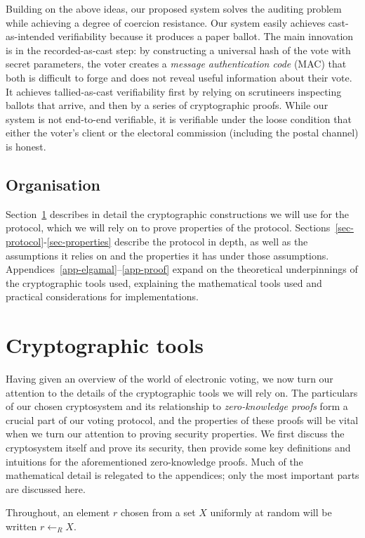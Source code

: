 \documentclass[12pt,a4paper]{article}
\theoremstyle{definition}
\newcounter{protocol}
\begin{document}
Building on the above ideas, our proposed system solves the auditing problem while achieving a degree of coercion resistance. Our system easily achieves cast-as-intended verifiability because it produces a paper ballot. The main innovation is in the recorded-as-cast step: by constructing a universal hash of the vote with secret parameters, the voter creates a \textit{message authentication code} (MAC) that both is difficult to forge and does not reveal useful information about their vote. It achieves tallied-as-cast verifiability first by relying on scrutineers inspecting ballots that arrive, and then by a series of cryptographic proofs. While our system is not end-to-end verifiable, it is verifiable under the loose condition that either the voter's client or the electoral commission (including the postal channel) is honest.

\subsection{Organisation}
Section~\ref{sec-crypto} describes in detail the cryptographic constructions we will use for the protocol, which we will rely on to prove properties of the protocol. Sections~\ref{sec-protocol}-\ref{sec-properties} describe the protocol in depth, as well as the assumptions it relies on and the properties it has under those assumptions. Appendices~\ref{app-elgamal}--\ref{app-proof} expand on the theoretical underpinnings of the cryptographic tools used, explaining the mathematical tools used and practical considerations for implementations.

\section{Cryptographic tools}\label{sec-crypto}
Having given an overview of the world of electronic voting, we now turn our attention to the details of the cryptographic tools we will rely on. The particulars of our chosen cryptosystem and its relationship to \textit{zero-knowledge proofs} form a crucial part of our voting protocol, and the properties of these proofs will be vital when we turn our attention to proving security properties. We first discuss the cryptosystem itself and prove its security, then provide some key definitions and intuitions for the aforementioned zero-knowledge proofs. Much of the mathematical detail is relegated to the appendices; only the most important parts are discussed here.

Throughout, an element $r$ chosen from a set $X$ uniformly at random will be written $r\gets_R X$.
\end{document}
